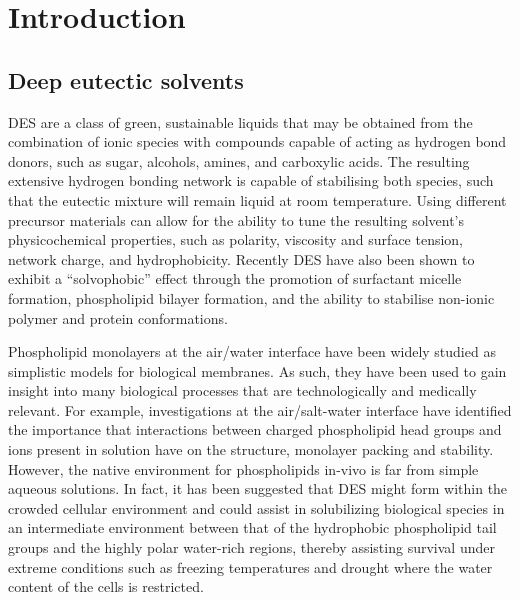 \section{Introduction}
\label{sec:ref1intro}
\subsection{Deep eutectic solvents}
DES are a class of green, sustainable liquids that may be obtained from the combination of ionic species with compounds capable of acting as hydrogen bond donors, such as sugar, alcohols, amines, and carboxylic acids.\autocite{smith_deep_2014,dai_natural_2013}
The resulting extensive hydrogen bonding network is capable of stabilising both species, such that the eutectic mixture will remain liquid at room temperature.\autocite{hammond_liquid_2016,hammond_resilience_2017,araujo_inelastic_2017}
Using different precursor materials can allow for the ability to tune the resulting solvent's physicochemical properties, such as polarity,\autocite{pandey_how_2014} viscosity and surface tension,\autocite{smith_deep_2014} network charge,\autocite{zahn_charge_2016} and hydrophobicity.\autocite{ribeiro_menthol-based_2015,van_osch_hydrophobic_2015}
Recently DES have also been shown to exhibit a ``solvophobic'' effect through the promotion of surfactant micelle formation,\autocite{sanchez-fernandez_micellization_2016,arnold_surfactant_2015,hsieh_micelle_2018,banjare_self-assembly_2018} phospholipid bilayer formation,\autocite{bryant_spontaneous_2016,bryant_effect_2017,gutierrez_freeze-drying_2009} and the ability to stabilise non-ionic polymer\autocite{sapir_properties_2016} and protein conformations.\autocite{sanchez-fernandez_protein_2017}

Phospholipid monolayers at the air/water interface have been widely studied as simplistic models for biological membranes.
As such, they have been used to gain insight into many biological processes that are technologically and medically relevant.
For example, investigations at the air/salt-water interface have identified the importance that interactions between charged phospholipid head groups and ions present in solution have on the structure, monolayer packing and stability.\autocite{mohwald_phospholipid_1990,kewalramani_effects_2010}
However, the native environment for phospholipids in-vivo is far from simple aqueous solutions.
In fact, it has been suggested\autocite{dai_natural_2013,hammond_resilience_2017} that DES might form within the crowded cellular environment and could assist in solubilizing biological species in an intermediate environment between that of the hydrophobic phospholipid tail groups and the highly polar water-rich regions, thereby assisting survival under extreme conditions such as freezing temperatures and drought where the water content of the cells is restricted.

